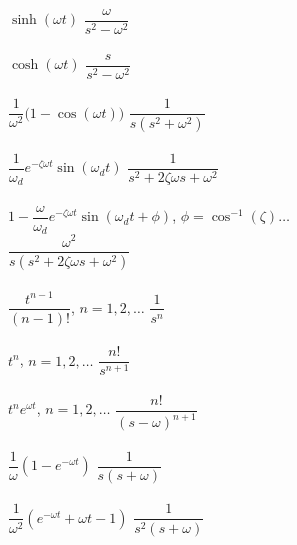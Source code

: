 \documentclass[12pt,letter]{article}
\begin{document}
{\begin{multicols}{2}
\begin{center}
\begin{tabbing}
				$\sinh (\omega t) $	\> $\dfrac{\omega}{s^2-\omega^2}$ \>\LTNUM \\ \\
				$\cosh (\omega t) $	\> $\dfrac{s}{s^2-\omega^2}$ \>\LTNUM \\ \\
				$\dfrac{1}{\omega^2}\big(1-\cos(\omega t)\big)$ \> $\dfrac{1}{s(s^2+\omega^2)}$ \>\LTNUM \\ \\
				$\dfrac{1}{\omega_d}e^{-\zeta \omega t}\sin(\omega_d t)$ \> $\dfrac{1}{s^2+2\zeta \omega s+\omega^2}$ \>\LTNUM \\ \\
				$1-\dfrac{\omega}{\omega_d}e^{-\zeta \omega t}\sin(\omega_d t + \phi)$, $\phi =\cos^{-1}(\zeta) \dots $ \\ \> $\dfrac{\omega^2}{s(s^2+2\zeta \omega s+\omega^2)}$ \>\LTNUM \\ \\
				$\dfrac{t^{n-1}}{(n-1)!}$, $ n=1,2,\dots $ \> $\dfrac{1}{s^n}$ \>\LTNUM \\ \\
				$t^n $, $n=1,2,\dots$     \> $\dfrac{n!}{s^{n+1}}$    \>\LTNUM \\ \\
				$t^ne^{\omega t}$, $ n=1,2,\dots $	\> $\dfrac{n!}{(s-\omega)^{n+1}}$	\>\LTNUM \\ \\
				$\dfrac{1}{\omega}(1-e^{-\omega t}) $	\> $\dfrac{1}{s(s+\omega)}$	\>\LTNUM \\ \\
				$\dfrac{1}{\omega^2}(e^{-\omega t}+\omega t - 1) $	\> $\dfrac{1}{s^2(s+\omega)}$	\>\LTNUM \\ \\
			\end{tabbing}
			\end{center}
			
			\columnbreak
			

\end{multicols}}
\end{document}
